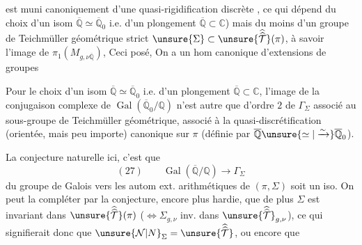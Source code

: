 
est muni canoniquement  d'une quasi-rigidification discrète , ce qui dépend du choix d'un isom $\overline{\mathbb Q}\simeq\overline{\mathbb Q}_0$ i.e. d'un plongement $\overline{\mathbb Q}\subset\mathbb C$) mais du moins d'un groupe de Teichmüller géométrique strict $\unsure{\Sigma}\subset\unsure{\widehat{\widehat{\mathcal T}}}(\pi)$, à savoir l'image de $\pi_1(M_{g,\nu\overline{\mathbb Q}})$,  Ceci posé, On a un hom canonique d'extensions de groupes


Pour le choix d'un isom $\overline{\mathbb Q}\simeq\overline{\mathbb Q}_0$ i.e. d'un plongement $\overline{\mathbb Q}\subset\mathbb C$, l'image de la conjugaison complexe de $\operatorname{Gal}(\overline{\mathbb Q}_0/\mathbb Q)$ n'est autre que  d'ordre $2$ de $\Gamma_\Sigma$ associé au sous-groupe de Teichmüller géométrique, associé à la quasi-discrétification (orientée, mais peu importe) canonique sur $\pi$ (définie par $\overline{\mathbb Q}\unsure{\simeq|\xrightarrow{\sim}}\overline{\mathbb Q}_0$).


La conjecture naturelle ici, c'est que
\[
(27)\qquad \operatorname{Gal}(\overline{\mathbb Q}/\mathbb Q)\longrightarrow\Gamma_\Sigma
\]
du groupe de Galois vers les autom ext. arithmétiques de $(\pi,\Sigma)$ soit un iso. On peut la compléter par la conjecture, encore plus hardie, que de plus $\Sigma$ est invariant dans $\unsure{\widehat{\widehat{\mathcal T}}}(\pi)$ ($\Longleftrightarrow\Sigma_{g,\nu}$ inv. dans $\unsure{\widehat{\widehat{\mathcal T}}}_{g,\nu}$), ce qui signifierait donc que $\unsure{\mathcal N|N}_\Sigma=\unsure{\widehat{\widehat{\mathcal T}}}$, ou encore que 

